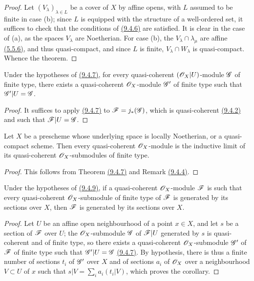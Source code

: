 \begin{proof}
\label{proof-thm-1.9.4.7}
Let
$(V_\lambda)_{\lambda\in L}$ be a cover of $X$ by affine opens, with $L$ assumed to be finite
in case (b); since $L$ is equipped with the structure of a well-ordered set, it suffices to
check that the conditions of \hyperref[lem-1.9.4.6]{(9.4.6)} are satisfied. It is clear in the case of (a),
as the spaces $V_\lambda$ are Noetherian. For case (b), the $V_\lambda\cap\lambda_\mu$ are
affine \hyperref[env-1.5.5.6]{(5.5.6)}, and thus quasi-compact, and since $L$ is finite,
$V_\lambda\cap W_\lambda$ is quasi-compact. Whence the theorem.
\end{proof}

\begin{cor}[9.4.8]
\label{cor-1.9.4.8}
Under the hypotheses of \hyperref[thm-1.9.4.7]{(9.4.7)}, for every quasi-coherent $(\mathscr{O}_X|U)$-module
$\mathscr{G}$ of finite type, there exists a quasi-coherent $\mathscr{O}_X$-module $\mathscr{G}'$ of finite
type such that $\mathscr{G}'|U=\mathscr{G}$.
\end{cor}

\begin{proof}
\label{proof-cor-1.9.4.8}
It suffices to apply \hyperref[thm-1.9.4.7]{(9.4.7)} to $\mathscr{F}=j_*(\mathscr{G})$, which is quasi-coherent
\hyperref[prop-1.9.4.2]{(9.4.2)} and such that $\mathscr{F}|U=\mathscr{G}$.
\end{proof}

\begin{cor}[9.4.9]
\label{cor-1.9.4.9}
Let $X$ be a prescheme whose underlying space is locally Noetherian, or a quasi-compact
scheme. Then every quasi-coherent $\mathscr{O}_X$-module is the inductive limit of its quasi-coherent
$\mathscr{O}_X$-submodules of finite type.
\end{cor}

\begin{proof}
\label{proof-cor-1.9.4.9}
This follows from Theorem \hyperref[thm-1.9.4.7]{(9.4.7)} and Remark \hyperref[rmk-1.9.4.4]{(9.4.4)}.
\end{proof}

\begin{cor}[9.4.10]
\label{cor-1.9.4.10}
Under the hypotheses of \hyperref[cor-1.9.4.9]{(9.4.9)}, if a quasi-coherent $\mathscr{O}_X$-module $\mathscr{F}$ is
such that every quasi-coherent $\mathscr{O}_X$-submodule of finite type of $\mathscr{F}$ is generated by
its sections over $X$, then $\mathscr{F}$ is generated by its sections over $X$.
\end{cor}

\begin{proof}
\label{proof-cor-1.9.4.10}
Let $U$ be an affine open neighbourhood of a point $x\in X$, and let $s$ be a
section of $\mathscr{F}$ over $U$; the $\mathscr{O}_X$-submodule $\mathscr{G}$ of $\mathscr{F}|U$ generated by $s$
is quasi-coherent and of finite type, so there exists a quasi-coherent $\mathscr{O}_X$-submodule
$\mathscr{G}'$ of $\mathscr{F}$ of finite type such that $\mathscr{G}'|U=\mathscr{G}$ \hyperref[thm-1.9.4.7]{(9.4.7)}. By
hypothesis, there is thus a finite number of sections $t_i$ of $\mathscr{G}'$ over $X$ and of
sections $a_i$ of $\mathscr{O}_X$ over a neighbourhood $V\subset U$ of $x$ such that
$s|V=\sum_i a_i(t_i|V)$, which proves the corollary.
\end{proof}

